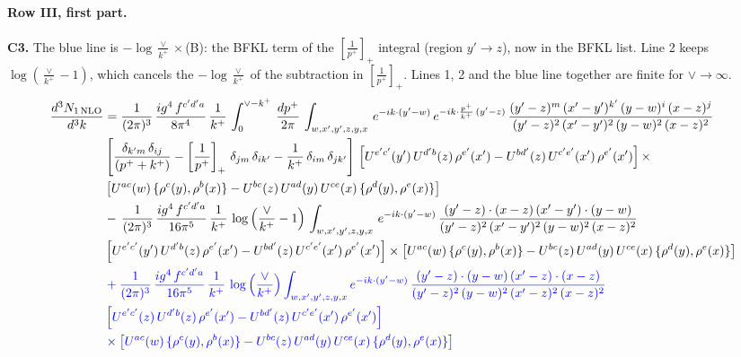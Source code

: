 \documentclass[10pt]{article}
\numberwithin{equation}{section}
\newcommand{\new}[1]{{\color{blue}#1}}
\newcommand{\nc}{\color{blue}}
\begin{document}
\paragraph{Row III, first part.}
\textbf{C3.} The \new{blue} line is $-\log\frac{\vee}{k^+}\times$(B): the BFKL term of the $\left[\frac{1}{p^+}\right]_+$ integral (region $y'\to z$), now in the BFKL list. Line 2 keeps $\log(\frac{\vee}{k^+}-1)$, which cancels the $-\log\frac{\vee}{k^+}$ of the subtraction in $\left[\frac{1}{p^+}\right]_+$. Lines 1, 2 and the blue line together are finite for $\vee\to\infty$.
\begin{align}
     \frac{d^{3}N_{1\,\rm NLO}}{d^{3}k} & =  \frac{1}{(2\pi)^{3}}\, \frac{ig^{4}\,f^{c'd'a}}{8\pi^{4}}\, \frac{1}{k^{+}}\,\int_{0}^{\vee-k^{+}}\,  \frac{dp^{+}}{2\pi}\, \int_{w,x',y',z,y,x}\, e^{-ik\cdot (y'-w)}\, e^{-ik\cdot \frac{p^{+}}{k^{+}}\,(y'-z)}\,\frac{(y'-z)^{m}\,(x'-y')^{k'}\,(y-w)^{i}\,(x-z)^{j}}{(y'-z)^{2}\,(x'-y')^{2}\,(y-w)^{2}\,(x-z)^{2}}\notag \\ & \left[\frac{\delta_{k'm}\,\delta_{ij}}{(p^{+}+k^{+})}-\left[\frac{1}{p^{+}}\right]_{+}\,\delta_{jm}\,\delta_{ik'}-\frac{1}{k^{+}}\, \delta_{im}\, \delta_{jk'}\right]\, \left[U^{e'c'}(y')\,U^{d'b}(z)\,\rho^{e'}(x')-U^{bd'}(z)\,U^{c'e'}(x')\,\rho^{e'}(x')\right]\times\notag \\ &  \left[U^{ac}(w)\, \{\rho^{c}(y),\rho^{b}(x)\}-U^{bc}(z)\,U^{ad}(y)\,U^{ce}(x)\,\{\rho^{d}(y),\rho^{e}(x)\}\right] \notag \\
& -\,\frac{1}{(2\pi)^{3}}\, \frac{ig^{4}\,f^{c'd'a}}{16\pi^{5}}\, \frac{1}{k^{+}}\,\log{\left(\frac{\vee}{k^{+}}-1\right)}\, \int_{w,x',y',z,y,x}\, e^{-ik\cdot (y'-w)}\,\frac{(y'-z)\cdot (x-z)\,(x'-y')\cdot (y-w)}{(y'-z)^{2}\,(x'-y')^{2}\,(y-w)^{2}\,(x-z)^{2}}\notag \\ &  \left[U^{e'c'}(y')\,U^{d'b}(z)\,\rho^{e'}(x')-U^{bd'}(z)\,U^{c'e'}(x')\,\rho^{e'}(x')\right]\times  \left[U^{ac}(w)\, \{\rho^{c}(y),\rho^{b}(x)\}-U^{bc}(z)\,U^{ad}(y)\,U^{ce}(x)\,\{\rho^{d}(y),\rho^{e}(x)\}\right] \notag \\
& \nc  +\frac{1}{(2\pi)^{3}}\, \frac{ig^{4}\,f^{c'd'a}}{16\pi^{5}}\, \frac{1}{k^{+}}\,\log{\left(\frac{\vee}{k^{+}}\right)}\int_{w,x',y',z,y,x} e^{-ik\cdot (y'-w)}\,\frac{(y'-z)\cdot (y-w)\,(x'-z)\cdot (x-z)}{(y'-z)^{2}\,(y-w)^{2}\,(x'-z)^{2}\,(x-z)^{2}}\notag \\
& \nc  \left[U^{e'c'}(z)\,U^{d'b}(z)\,\rho^{e'}(x')-U^{bd'}(z)\,U^{c'e'}(x')\,\rho^{e'}(x')\right]\notag \\
& \nc  \times\left[U^{ac}(w)\, \{\rho^{c}(y),\rho^{b}(x)\}-U^{bc}(z)\,U^{ad}(y)\,U^{ce}(x)\,\{\rho^{d}(y),\rho^{e}(x)\}\right] \label{eq:F:G3III1}
\end{align}
\end{document}
